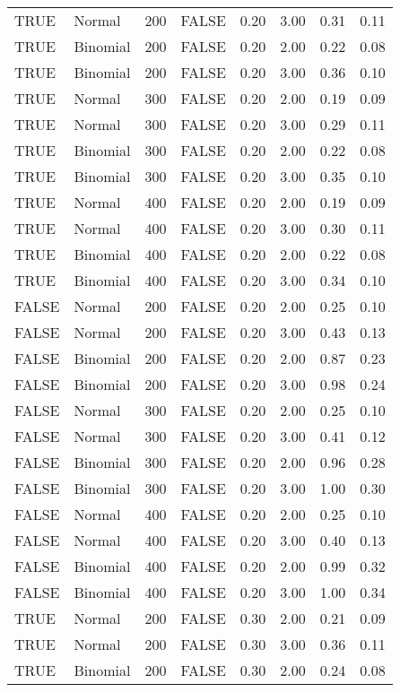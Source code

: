 \begin{longtable}{llrlrrrr}
  TRUE & Normal & 200 & FALSE & 0.20 & 3.00 & 0.31 & 0.11 \\ 
  TRUE & Binomial & 200 & FALSE & 0.20 & 2.00 & 0.22 & 0.08 \\ 
  TRUE & Binomial & 200 & FALSE & 0.20 & 3.00 & 0.36 & 0.10 \\ 
  TRUE & Normal & 300 & FALSE & 0.20 & 2.00 & 0.19 & 0.09 \\ 
  TRUE & Normal & 300 & FALSE & 0.20 & 3.00 & 0.29 & 0.11 \\ 
  TRUE & Binomial & 300 & FALSE & 0.20 & 2.00 & 0.22 & 0.08 \\ 
  TRUE & Binomial & 300 & FALSE & 0.20 & 3.00 & 0.35 & 0.10 \\ 
  TRUE & Normal & 400 & FALSE & 0.20 & 2.00 & 0.19 & 0.09 \\ 
  TRUE & Normal & 400 & FALSE & 0.20 & 3.00 & 0.30 & 0.11 \\ 
  TRUE & Binomial & 400 & FALSE & 0.20 & 2.00 & 0.22 & 0.08 \\ 
  TRUE & Binomial & 400 & FALSE & 0.20 & 3.00 & 0.34 & 0.10 \\ 
  FALSE & Normal & 200 & FALSE & 0.20 & 2.00 & 0.25 & 0.10 \\ 
  FALSE & Normal & 200 & FALSE & 0.20 & 3.00 & 0.43 & 0.13 \\ 
  FALSE & Binomial & 200 & FALSE & 0.20 & 2.00 & 0.87 & 0.23 \\ 
  FALSE & Binomial & 200 & FALSE & 0.20 & 3.00 & 0.98 & 0.24 \\ 
  FALSE & Normal & 300 & FALSE & 0.20 & 2.00 & 0.25 & 0.10 \\ 
  FALSE & Normal & 300 & FALSE & 0.20 & 3.00 & 0.41 & 0.12 \\ 
  FALSE & Binomial & 300 & FALSE & 0.20 & 2.00 & 0.96 & 0.28 \\ 
  FALSE & Binomial & 300 & FALSE & 0.20 & 3.00 & 1.00 & 0.30 \\ 
  FALSE & Normal & 400 & FALSE & 0.20 & 2.00 & 0.25 & 0.10 \\ 
  FALSE & Normal & 400 & FALSE & 0.20 & 3.00 & 0.40 & 0.13 \\ 
  FALSE & Binomial & 400 & FALSE & 0.20 & 2.00 & 0.99 & 0.32 \\ 
  FALSE & Binomial & 400 & FALSE & 0.20 & 3.00 & 1.00 & 0.34 \\ 
  TRUE & Normal & 200 & FALSE & 0.30 & 2.00 & 0.21 & 0.09 \\ 
  TRUE & Normal & 200 & FALSE & 0.30 & 3.00 & 0.36 & 0.11 \\ 
  TRUE & Binomial & 200 & FALSE & 0.30 & 2.00 & 0.24 & 0.08 \\ 

\end{longtable}
